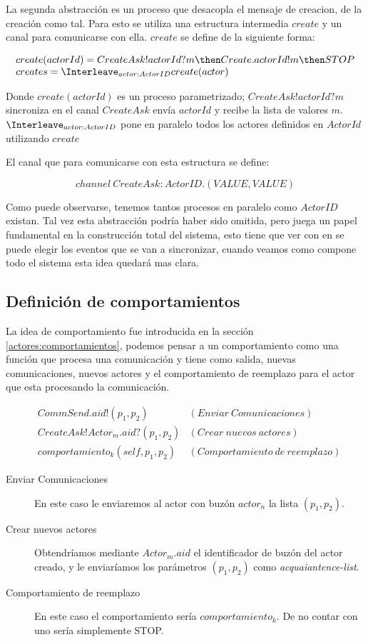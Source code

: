 La segunda abstracción es un proceso que desacopla el mensaje de creacion, de la creación como tal. Para esto se utiliza una estructura intermedia $create$ y un canal para comunicarse con ella. $create$ se define de la siguiente forma: 

\[
\begin{array}{l}
create(actorId) = CreateAsk!actorId?m \then Create.actorId!m \then STOP \\
creates = \Interleave_{actor : ActorID} create(actor)
\end{array}
\]

Donde $create(actorId)$ es un proceso parametrizado; $CreateAsk!actorId?m$ sincroniza en el canal $CreateAsk$ envía $actorId$ y recibe la lista de valores $m$. $\Interleave_{actor : ActorID}$ pone en paralelo todos los actores definidos en $ActorId$ utilizando $create$

El canal que para comunicarse con esta estructura se define:

\[
channel\ CreateAsk:ActorID.(VALUE, VALUE)
\]

Como puede observarse, tenemos tantos procesos en paralelo como $ActorID$ existan. Tal vez esta abstracción podría haber sido omitida, pero juega un papel fundamental en la construcción total del sistema, esto tiene que ver con en \CSP se puede elegir los eventos \cite[chap.~2,p.~55]{Roscoe:1997:TPC:550448} que se van a sincronizar, cuando veamos como compone todo el sistema esta idea quedará mas clara.

\subsection{Definición de comportamientos}
La idea de comportamiento fue introducida en la sección \ref{actores:comportamientos}, podemos pensar a un comportamiento como una función que procesa una comunicación y tiene como salida, nuevas comunicaciones, nuevos actores y el comportamiento de reemplazo para el actor que esta procesando la comunicación.

\begin{align*}
&CommSend.aid!(p_1, p_2) & (Enviar\ Comunicaciones) \\ 
&CreateAsk!Actor_m.aid?(p_1, p_2) & (Crear\ nuevos\ actores)\\
&comportamiento_k(self, p_1, p_2)  & (Comportamiento\ de\ reemplazo)
\end{align*}

\begin{description}
\item [Enviar Comunicaciones] En este caso le enviaremos al actor con buzón $actor_n$ la lista $(p_1, p_2)$. 
\item [Crear nuevos actores] Obtendríamos mediante $Actor_m.aid$ el identificador de buzón del actor creado, y le enviaríamos los parámetros $(p_1, p_2)$ como \textit{acquaiantence-list}.
\item [Comportamiento de reemplazo] En este caso el comportamiento sería $comportamiento_k$. De no contar con uno sería simplemente STOP.
\end{description}

